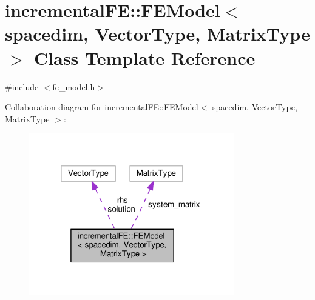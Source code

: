 \hypertarget{classincremental_f_e_1_1_f_e_model}{}\section{incremental\+FE\+:\+:F\+E\+Model$<$ spacedim, Vector\+Type, Matrix\+Type $>$ Class Template Reference}
\label{classincremental_f_e_1_1_f_e_model}


{\ttfamily \#include $<$fe\+\_\+model.\+h$>$}



Collaboration diagram for incremental\+FE\+:\+:F\+E\+Model$<$ spacedim, Vector\+Type, Matrix\+Type $>$\+:\nopagebreak
\begin{figure}[H]
\begin{center}
\leavevmode
\includegraphics[width=253pt]{classincremental_f_e_1_1_f_e_model__coll__graph}
\end{center}
\end{figure}
